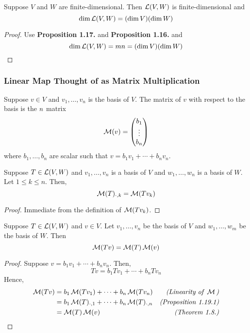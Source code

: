 \begin{proposition}
    Suppose $V$ and $W$ are finite-dimensional. Then $\operatorname{\mathcal{L}}(V,W)$ is finite-dimensional and
    \[ \dim \operatorname{\mathcal{L}}(V,W) = (\dim V ) (\dim W) \]
\end{proposition}

\begin{proof}
    Use \textbf{Proposition 1.17.} and \textbf{Proposition 1.16.} and 
    \[ \dim \operatorname{\mathcal{L}}(V,W) = mn = (\dim V)(\dim W) \]
\end{proof}

\subsubsection{Linear Map Thought of as Matrix Multiplication}

\begin{definition}
    Suppose $v \in V$ and $v_1, \ldots, v_n$ is the basis of $V$. The matrix of $v$ with respect to the basis is the $n \time 1$ matrix
    \[ \operatorname{\mathcal{M}}(v) = \begin{pmatrix}
        b_1 \\ 
        \vdots \\
        b_n
    \end{pmatrix} \]
    where $b_1, \ldots, b_n$ are scalar such that $v = b_1 v_1 + \cdots + b_n v_n$.
\end{definition}

\begin{proposition}
    Suppose $T \in \operatorname{\mathcal{L}}(V,W)$ and $v_1, \ldots, v_n$ is a basis of $V$ and $w_1, \ldots, w_n$ is a basis of $W$. Let $1 \le k \le n$.
    Then,
    \[ \operatorname{\mathcal{M}}(T)_{\cdot, k} = \operatorname{\mathcal{M}}(Tv_k) \]
\end{proposition}

\begin{proof}
    Immediate from the definition of $\operatorname{\mathcal{M}}(Tv_k)$.
\end{proof}

\begin{proposition}
    Suppose $T \in \operatorname{\mathcal{L}}(V,W)$ and $v \in V$. Let $v_1, \ldots, v_n$ be the basis of $V$ and $w_1, \ldots, w_m$ be the basis of $W$. Then
    \[ \operatorname{\mathcal{M}}(Tv) = \operatorname{\mathcal{M}}(T) \operatorname{\mathcal{M}}(v) \] 
\end{proposition}

\begin{proof}
    Suppose $v=b_1v_1 + \cdots + b_n v_n$. Then,
    \[ Tv = b_1 Tv_1 + \cdots + b_n Tv_n \]
    Hence, 
    \begin{align*}
        \operatorname{\mathcal{M}}(Tv) &= b_1 \operatorname{\mathcal{M}}(Tv_1) + \cdots + b_n \operatorname{\mathcal{M}}(Tv_n)  & \textit{(Linearity of } \operatorname{\mathcal{M}} \textit{)} \\
        &= b_1 \operatorname{\mathcal{M}}(T)_{\cdot,1} + \cdots + b_n \operatorname{\mathcal{M}}(T)_{\cdot, n} & \textit{(Proposition 1.19.1)} \\
        &= \operatorname{\mathcal{M}}(T) \operatorname{\mathcal{M}}(v) & \textit{(Theorem 1.8.)}
    \end{align*}
\end{proof}

